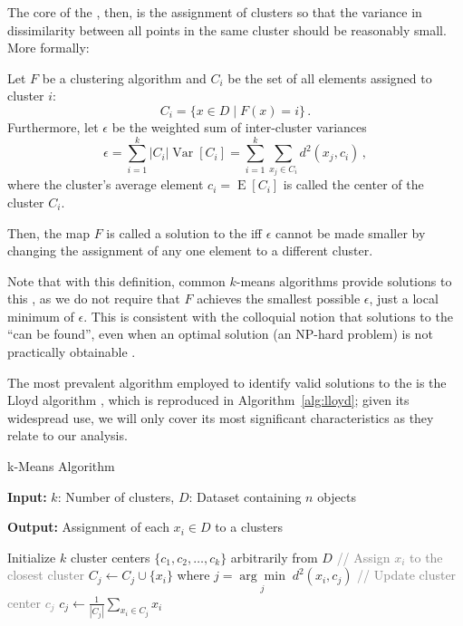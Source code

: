 The core of the \kmeans, then, is the assignment of clusters so that the variance in dissimilarity between all points in the same cluster should be reasonably small.
More formally:
\begin{definition}[\kmeans]
	Let $F$ be a clustering algorithm
	and $C_i$ be the set of all elements assigned to cluster $i$:
	$$ C_i = \{x \in D \mid F(x) = i\} \,.$$
	Furthermore, let $\epsilon$ be the weighted sum of inter-cluster variances
	$$ \epsilon = \sum_{i=1}^k |C_i| \operatorname{Var}[C_i] = \sum_{i=1}^k \sum_{x_j \in C_i}  d^2(x_j, c_i)\,, $$
	where the cluster's average element $c_i = \operatorname{E}[C_i]$ is called the center of the cluster $C_i$.

	Then, the map $F$ is called a solution to the \kmeans
	iff $\epsilon$ cannot be made smaller by changing the assignment of any one element to a different cluster.
\end{definition}
Note that with this definition, common $k$-means algorithms provide solutions to this \kmeans,
as we do not require that $F$ achieves the smallest possible $\epsilon$,
just a local minimum of $\epsilon$.
This is consistent with the colloquial notion that solutions to the \kmeans ``can be found'',
even when an optimal solution (an NP-hard problem) is not practically obtainable \cite{han2012data}.

The most prevalent algorithm employed to identify valid solutions to the \kmeans is the Lloyd algorithm \cite{DBLP:journals/tit/Lloyd82}, which is reproduced in Algorithm~\ref{alg:lloyd};
given its widespread use, we will only cover its most significant characteristics as they relate to our analysis.

\begin{algorithm}[t]
	\caption{k-Means Algorithm}
	\label{alg:lloyd}

	\textbf{Input:} \( k \): Number of clusters, \( D \): Dataset containing \( n \) objects

	\textbf{Output:} Assignment of each $x_i \in D$ to a clusters

	\begin{algorithmic}[1]
		\State Initialize \( k \) cluster centers \( \{c_1, c_2, \dots, c_k\} \) arbitrarily from \( D \)
		\Repeat
		\State \textcolor{gray}{// Assign \( x_i \) to the closest cluster}
		\label{algstep:assign}
		\State \( C_j \leftarrow C_j \cup \{x_i\} \) where \( j = \underset{j}{\arg\min} \; d^2(x_i, c_j) \)
		\EndFor
		\State \textcolor{gray}{// Update cluster center \( c_j \)}
		\State \( c_j \leftarrow \frac{1}{|C_j|} \sum_{x_i \in C_j} x_i \)
		\EndFor
	\end{algorithmic}
\end{algorithm}

